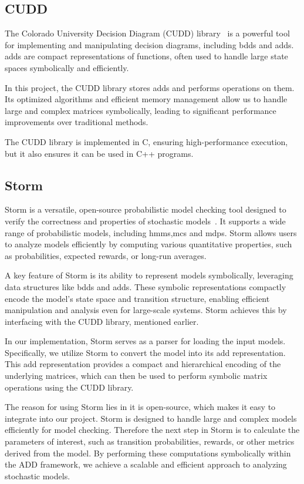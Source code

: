\subsection{CUDD}\label{subsec:cudd}
The Colorado University Decision Diagram (CUDD) library~\cite{somenzi1997cudd} is a powerful tool for implementing and manipulating decision diagrams, including \glspl{bdd} and \glspl{add}. \glspl{add} are compact representations of functions, often used to handle large state spaces symbolically and efficiently.

In this project, the CUDD library stores \glspl{add} and performs operations on them.
Its optimized algorithms and efficient memory management allow us to handle large and complex matrices symbolically, leading to significant performance improvements over traditional methods.

The CUDD library is implemented in C, ensuring high-performance execution, but it also ensures it can be used in C++ programs.

\subsection{Storm}\label{subsec:storm}
Storm is a versatile, open-source probabilistic model checking tool designed to verify the correctness and properties of stochastic models~\cite{hensel2021probabilistic}. It supports a wide range of probabilistic models, including \glspl{hmm},\glspl{mc} and \glspl{mdp}. Storm allows users to analyze models efficiently by computing various quantitative properties, such as probabilities, expected rewards, or long-run averages.

A key feature of Storm is its ability to represent models symbolically, leveraging data structures like \glspl{bdd} and \glspl{add}. These symbolic representations compactly encode the model's state space and transition structure, enabling efficient manipulation and analysis even for large-scale systems. Storm achieves this by interfacing with the CUDD library, mentioned earlier.

In our implementation, Storm serves as a parser for loading the input models. Specifically, we utilize Storm to convert the model into its \gls{add} representation. This \gls{add} representation provides a compact and hierarchical encoding of the underlying matrices, which can then be used to perform symbolic matrix operations using the CUDD library.

The reason for using Storm lies in it is open-source, which makes it easy to integrate into our project. Storm is designed to handle large and complex models efficiently for model checking.
Therefore the next step in Storm is to calculate the parameters of interest, such as transition probabilities, rewards, or other metrics derived from the model. By performing these computations symbolically within the ADD framework, we achieve a scalable and efficient approach to analyzing stochastic models.


